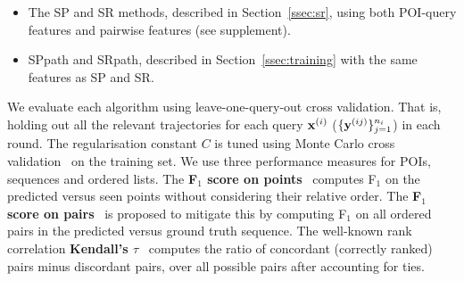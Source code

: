 \begin{itemize}[leftmargin=0.125in]
\item The SP and SR methods, described in Section~\ref{ssec:sr}, using both POI-query features and pairwise features (see supplement).

\item {\sc SPpath} and {\sc SRpath}, described in Section~\ref{ssec:training} with the same features as SP and SR.
\end{itemize}\itemmoveup



We evaluate each algorithm using leave-one-query-out cross validation.
That is, holding out all the relevant trajectories for each query $\mathbf{x}^{({i})}$ (\ie $\{\mathbf{y}^{({ij})}\}_{j=1}^{n_i}$) in each round.
The regularisation constant $C$ is tuned using Monte Carlo cross validation~\cite{burman1989comparative} on the training set.
We use three performance measures for POIs, sequences and ordered lists.
The {\bf F$_1$ score on points}~\cite{ijcai15} computes F$_1$ on the predicted versus seen points
without considering their relative order.
The {\bf F$_1$ score on pairs}~\cite{cikm16paper} is proposed to mitigate this by computing F$_1$ on all ordered pairs in the predicted versus ground truth sequence. %
The well-known rank correlation {\bf Kendall's $\tau$}~\cite{agresti2010analysis}
computes the ratio of concordant (correctly ranked) pairs minus discordant pairs, over all possible pairs after accounting for ties.%

